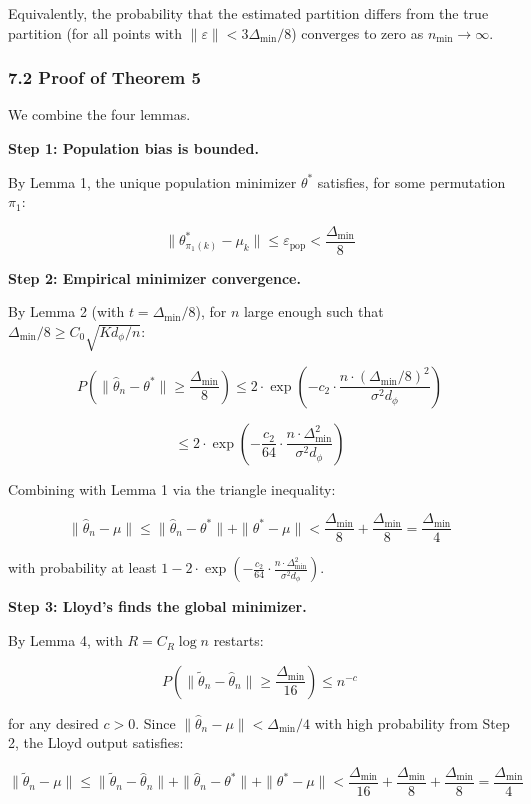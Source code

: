 \documentclass[
  12pt,
]{article}
\begin{document}
Equivalently, the probability that the estimated partition differs from
the true partition (for all points with
\(\|\varepsilon\| < 3\Delta_{\min}/8\)) converges to zero as
\(n_{\min} \to \infty\).

\subsubsection{7.2 Proof of Theorem 5}\label{proof-of-theorem-5}

We combine the four lemmas.

\textbf{Step 1: Population bias is bounded.}

By Lemma 1, the unique population minimizer \(\theta^*\) satisfies, for
some permutation \(\pi_1\):

\[\|\theta^*_{\pi_1(k)} - \mu_k\| \leq \varepsilon_{\text{pop}} < \frac{\Delta_{\min}}{8}\]

\textbf{Step 2: Empirical minimizer convergence.}

By Lemma 2 (with \(t = \Delta_{\min}/8\)), for \(n\) large enough such
that \(\Delta_{\min}/8 \geq C_0\sqrt{K d_\phi / n}\):

\[P\left(\|\hat{\theta}_n - \theta^*\| \geq \frac{\Delta_{\min}}{8}\right) \leq 2 \cdot \exp\left(-c_2 \cdot \frac{n \cdot (\Delta_{\min}/8)^2}{\sigma^2 d_\phi}\right)\]

\[\leq 2 \cdot \exp\left(-\frac{c_2}{64} \cdot \frac{n \cdot \Delta_{\min}^2}{\sigma^2 d_\phi}\right)\]

Combining with Lemma 1 via the triangle inequality:

\[\|\hat{\theta}_n - \mu\| \leq \|\hat{\theta}_n - \theta^*\| + \|\theta^* - \mu\| < \frac{\Delta_{\min}}{8} + \frac{\Delta_{\min}}{8} = \frac{\Delta_{\min}}{4}\]

with probability at least
\(1 - 2 \cdot \exp\left(-\frac{c_2}{64} \cdot \frac{n \cdot \Delta_{\min}^2}{\sigma^2 d_\phi}\right)\).

\textbf{Step 3: Lloyd's finds the global minimizer.}

By Lemma 4, with \(R = C_R \log n\) restarts:

\[P\left(\|\tilde{\theta}_n - \hat{\theta}_n\| \geq \frac{\Delta_{\min}}{16}\right) \leq n^{-c}\]

for any desired \(c > 0\). Since
\(\|\hat{\theta}_n - \mu\| < \Delta_{\min}/4\) with high probability
from Step 2, the Lloyd output satisfies:

\[\|\tilde{\theta}_n - \mu\| \leq \|\tilde{\theta}_n - \hat{\theta}_n\| + \|\hat{\theta}_n - \theta^*\| + \|\theta^* - \mu\| < \frac{\Delta_{\min}}{16} + \frac{\Delta_{\min}}{8} + \frac{\Delta_{\min}}{8} = \frac{\Delta_{\min}}{4}\]
\end{document}
